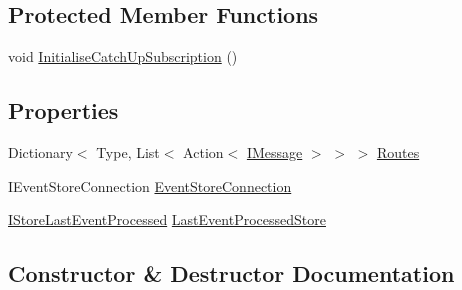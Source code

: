 \subsection*{Protected Member Functions}
\begin{DoxyCompactItemize}
\item 
void \hyperlink{classCqrs_1_1EventStore_1_1Bus_1_1EventStoreEventPublisher_a145dd61678031747b4c1768e68937181}{Initialise\+Catch\+Up\+Subscription} ()
\end{DoxyCompactItemize}
\subsection*{Properties}
\begin{DoxyCompactItemize}
\item 
Dictionary$<$ Type, List$<$ Action$<$ \hyperlink{interfaceCqrs_1_1Messages_1_1IMessage}{I\+Message} $>$ $>$ $>$ \hyperlink{classCqrs_1_1EventStore_1_1Bus_1_1EventStoreEventPublisher_a89bf01d1921bc517ea8b385c0ee724ee}{Routes}
\item 
I\+Event\+Store\+Connection \hyperlink{classCqrs_1_1EventStore_1_1Bus_1_1EventStoreEventPublisher_a16df48a7203bc3bcde5f5a12f1d47934}{Event\+Store\+Connection}
\item 
\hyperlink{interfaceCqrs_1_1Bus_1_1IStoreLastEventProcessed}{I\+Store\+Last\+Event\+Processed} \hyperlink{classCqrs_1_1EventStore_1_1Bus_1_1EventStoreEventPublisher_a552a16f86c52837bf81200778e3a9fe4}{Last\+Event\+Processed\+Store}
\end{DoxyCompactItemize}


\subsection{Constructor \& Destructor Documentation}
\mbox{\label{classCqrs_1_1EventStore_1_1Bus_1_1EventStoreEventPublisher_a4ca16479fe387fae0135865ae3f889d7}} 
